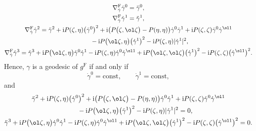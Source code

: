 \begin{gather*}
\nabla^{\mathrm{F}}_{\dot\gamma}\dot\gamma^0=\ddot\gamma^0, \\
\nabla^{\mathrm{F}}_{\dot\gamma}\dot\gamma^1=\ddot\gamma^1, \\
\nabla^{\mathrm{F}}_{\dot\gamma}\dot\gamma^2
= \ddot\gamma^2+{\rm i}P(\zeta, \eta)\bigl(\dot\gamma^0\bigr)^2+{\rm i}\bigl(P\bigl(\zeta, \ol\zeta\bigr)-P(\eta, \eta)\bigr)\dot\gamma^0\dot\gamma^1+{\rm i}P(\zeta, \zeta)\dot\gamma^0\dot\gamma^{\ol1} \\
\hphantom{\nabla^{\mathrm{F}}_{\dot\gamma}\dot\gamma^2=}{}
-{\rm i}P\bigl(\ol\zeta, \eta\bigr)\bigl(\dot\gamma^1\bigr)^2-{\rm i}P(\zeta, \eta)|\dot\gamma^1|^2, \\
\nabla^{\mathrm{F}}_{\dot\gamma}\dot\gamma^3
=\ddot\gamma^3+{\rm i}P\bigl(\ol\zeta, \eta\bigr)\dot\gamma^0\dot\gamma^1-{\rm i}P(\zeta, \eta)\dot\gamma^0\dot\gamma^{\ol1}+{\rm i}P\bigl(\ol\zeta, \ol\zeta\bigr)\bigl(\dot\gamma^1\bigr)^2-{\rm i}P(\zeta, \zeta)\bigl(\dot\gamma^{\ol1}\bigr)^2.
\end{gather*}
Hence, $\gamma$ is a geodesic of $g^{\mathrm{F}}$ if and only if
\begin{equation*}
\dot\gamma^0=\mathrm{const}, \qquad \dot\gamma^1=\mathrm{const},
\end{equation*}
and
\begin{gather}
 \ddot\gamma^2+{\rm i}P(\zeta, \eta)\bigl(\dot\gamma^0\bigr)^2+{\rm i}\bigl(P\bigl(\zeta, \ol\zeta\bigr)-P(\eta, \eta)\bigr)\dot\gamma^0\dot\gamma^1+{\rm i}P(\zeta, \zeta) \dot\gamma^0\dot\gamma^{\ol1} \nonumber \\
 \qquad{} -{\rm i}P\bigl(\ol\zeta, \eta\bigr)\bigl(\dot\gamma^1\bigr)^2-{\rm i}P(\zeta, \eta)|\dot\gamma^1|^2=0,\label{geodesic2}
\\
\ddot\gamma^3+{\rm i}P\bigl(\ol\zeta, \eta\bigr)\dot\gamma^0\dot\gamma^1-{\rm i}P(\zeta, \eta)\dot\gamma^0\dot\gamma^{\ol1}+{\rm i}P\bigl(\ol\zeta, \ol\zeta\bigr)\bigl(\dot\gamma^1\bigr)^2-{\rm i}P(\zeta, \zeta)\bigl(\dot\gamma^{\ol1}\bigr)^2=0.\label{geodesic3}
\end{gather}

